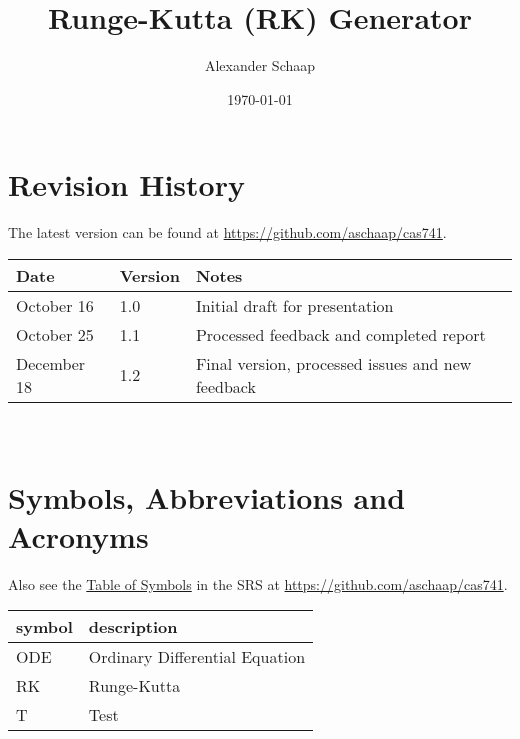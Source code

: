 \documentclass[12pt, titlepage]{article}
\begin{document}
\title{Runge-Kutta (RK) Generator} 
\author{Alexander Schaap}
\date{\today}
	
\maketitle


\section{Revision History}
The latest version can be found at \url{https://github.com/aschaap/cas741}.\\

\noindent
\begin{tabularx}{\textwidth}{p{3cm}p{2cm}X}
\toprule {\bf Date} & {\bf Version} & {\bf Notes}\\
\midrule
October 16 & 1.0 & Initial draft for presentation\\
October 25 & 1.1 & Processed feedback and completed report\\
December 18 & 1.2 & Final version, processed issues and new feedback\\
\bottomrule
\end{tabularx}

~\newpage

\section{Symbols, Abbreviations and Acronyms}
Also see the \href{../SRS/CA.pdf#ssec:symbols}{Table of Symbols} in the SRS at 
\url{https://github.com/aschaap/cas741}.\\

\noindent
\renewcommand{\arraystretch}{1.2}
\begin{tabular}{l l} 
  \toprule		
  \textbf{symbol} & \textbf{description}\\
  \midrule 
  ODE & Ordinary Differential Equation\\
  RK & Runge-Kutta\\
  T & Test\\
  \bottomrule
\end{tabular}\\


\newpage

\tableofcontents
\end{document}

